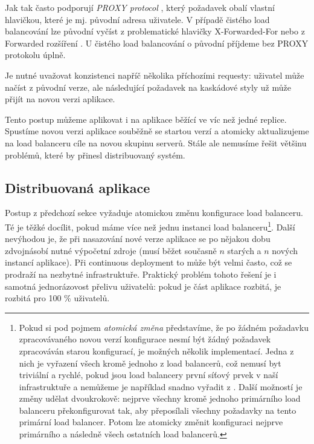             Jak  tak   často podporují \textit{PROXY protocol} \cite{tarreau-proxyprotocol}, který požadavek obalí vlastní hlavičkou, které je mj. původní  adresa uživatele. V případě čistého  load balancování lze původní  vyčíst z problematické \cite{hansen-xforwardedfor} hlavičky X-Forwarded-For nebo z Forwarded rozšíření \cite{http-forwarded}. U čistého  load balancování o původní  příjdeme bez PROXY protokolu úplně.

            Je nutné uvažovat konzistenci napříč několika příchozími \HTTP requesty: uživatel může načíst \HTML z původní verze, ale následující \HTTP požadavek na kaskádové styly už může přijít na novou verzi aplikace.

            Tento postup můžeme aplikovat i na aplikace běžící ve víc než jedné replice. Spustíme novou verzi aplikace souběžně se startou verzí a atomicky aktualizujeme na load balanceru cíle na novou skupinu serverů. Stále ale nemusíme řešit většinu problémů, které by přinesl distribuovaný systém.

        \subsection*{Distribuovaná aplikace}
            \label{distributed-apps}
            Postup z předchozí sekce vyžaduje atomickou změnu konfigurace load balanceru. Té je těžké docílit, pokud máme více než jednu instanci load balanceru\footnote{Pokud si pod pojmem \textit{atomická změna} představíme, že po žádném požadavku zpracovávaného novou verzí konfigurace nesmí být žádný požadavek zpracováván starou konfigurací, je možných několik implementací. Jedna z nich je vyřazení všech kromě jednoho z load balancerů, což nemusí byt triviální a rychlé, pokud jsou load balancery první síťový prvek v naší infrastruktuře a nemůžeme je například snadno vyřadit z . Další možností je změny udělat dvoukrokově: nejprve všechny kromě jednoho primárního load balanceru překonfigurovat tak, aby přeposílali všechny požadavky na tento primární load balancer. Potom lze atomicky změnit konfiguraci nejprve primárního a následně všech ostatních load balancerů.}. Další nevýhodou je, že při nasazování nové verze aplikace se po nějakou dobu zdvojnásobí nutné výpočetní zdroje (musí běžet současně $n$ starých a $n$ nových instancí aplikace). Při continuous deployment to může být velmi často, což se prodraží na nezbytné infrastruktuře. Praktický problém tohoto řešení je i samotná jednorázovost přelivu uživatelů: pokud je část aplikace rozbitá, je rozbitá pro 100 \% uživatelů.

